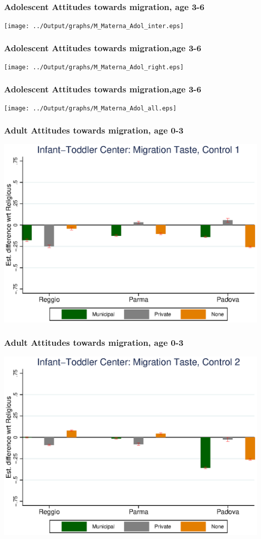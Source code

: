\documentclass{beamer}
\begin{document}
\begin{frame}\frametitle{Adolescent Attitudes towards migration, age 3-6}
\center
\texttt{[image: ../Output/graphs/M\_Materna\_Adol\_inter.eps]}
\end{frame}

\begin{frame}\frametitle{Adolescent Attitudes towards migration,age 3-6}
\center
\texttt{[image: ../Output/graphs/M\_Materna\_Adol\_right.eps]}
\end{frame}

\begin{frame}\frametitle{Adolescent Attitudes towards migration,age 3-6}
\center
\texttt{[image: ../Output/graphs/M\_Materna\_Adol\_all.eps]}
\end{frame}

\begin{frame}\frametitle{Adult Attitudes towards migration, age 0-3}
\center
\includegraphics[scale=0.7]{../Output/graphs/M_Asilo_Adult_main.eps}
\end{frame}

\begin{frame}\frametitle{Adult Attitudes towards migration, age 0-3}
\center
\includegraphics[scale=0.7]{../Output/graphs/M_Asilo_Adult_inter.eps}
\end{frame}
\end{document}

